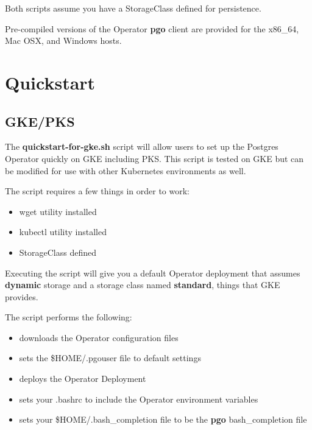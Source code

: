 \documentclass[letterpaper,12pt]{article}
\let\stdsection\section
\renewcommand\section{\newpage\stdsection}
\begin{document}
Both scripts assume you have a StorageClass defined for persistence.

Pre-compiled versions of the Operator \textbf{pgo} client are provided for the x86\_64, Mac OSX, and Windows hosts.

\section{Quickstart}\label{/_quickstart}

\subsection{GKE/PKS}\label{/_quickstart/_gke_pks}

The \textbf{quickstart-for-gke.sh} script will allow users to set up the Postgres Operator quickly on GKE including PKS. This script is tested on GKE but can be modified for use with other Kubernetes environments as well.

The script requires a few things in order to work:

\begin{itemize}
    \item wget utility installed 
    \item kubectl utility installed 
    \item StorageClass defined 
\end{itemize}
Executing the script will give you a default Operator deployment that assumes \textbf{dynamic} storage and a storage class named \textbf{standard}, things that GKE provides.

The script performs the following:

\begin{itemize}
    \item downloads the Operator configuration files 
    \item sets the \$HOME/.pgouser file to default settings 
    \item deploys the Operator Deployment 
    \item sets your .bashrc to include the Operator environment variables 
    \item sets your \$HOME/.bash\_completion file to be the \textbf{pgo} bash\_completion file 
\end{itemize}
\end{document}
